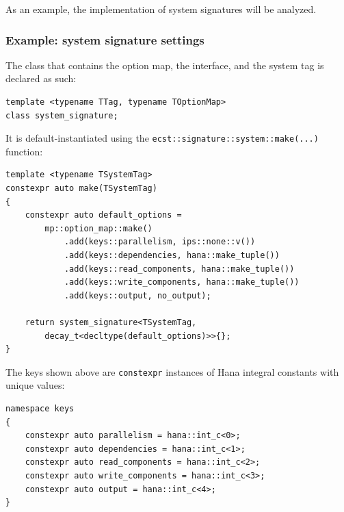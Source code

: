\documentclass[twoside, 12pt, a4paper, openany]{book}
\begin{document}
As an example, the implementation of system signatures will be analyzed.

\subsubsection{Example: system signature
settings}\label{example-system-signature-settings}

The class that contains the option map, the interface, and the system
tag is declared as such:

\begin{verbatim}
template <typename TTag, typename TOptionMap>
class system_signature;
\end{verbatim}

It is default-instantiated using the
\texttt{ecst::signature::system::make(...)}
function:

\begin{verbatim}
template <typename TSystemTag>
constexpr auto make(TSystemTag)
{
    constexpr auto default_options =
        mp::option_map::make()
            .add(keys::parallelism, ips::none::v())
            .add(keys::dependencies, hana::make_tuple())
            .add(keys::read_components, hana::make_tuple())
            .add(keys::write_components, hana::make_tuple())
            .add(keys::output, no_output);

    return system_signature<TSystemTag,
        decay_t<decltype(default_options)>>{};
}
\end{verbatim}

The keys shown above are
\texttt{constexpr}
instances of Hana integral constants with unique values:

\begin{verbatim}
namespace keys
{
    constexpr auto parallelism = hana::int_c<0>;
    constexpr auto dependencies = hana::int_c<1>;
    constexpr auto read_components = hana::int_c<2>;
    constexpr auto write_components = hana::int_c<3>;
    constexpr auto output = hana::int_c<4>;
}
\end{verbatim}
\end{document}
